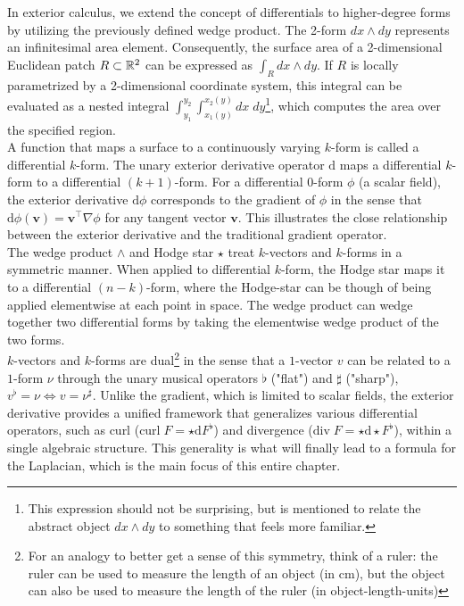 In exterior calculus, we extend the concept of differentials to higher-degree forms by utilizing the previously defined wedge product. The 2-form $dx \wedge dy$ represents an infinitesimal area element. Consequently, the surface area of a 2-dimensional Euclidean patch $R \subset \mathbb{R}^2$ can be expressed as $\int_{R} dx \wedge dy$. If $R$ is locally parametrized by a 2-dimensional coordinate system, this integral can be evaluated as a nested integral $\int_{y_1}^{y_2}\int_{x_1(y)}^{x_2(y)} dx \; dy$\footnote{This expression should not be surprising, but is mentioned to relate the abstract object $dx \wedge dy$ to something that feels more familiar.}, which computes the area over the specified region.
\\
A function that maps a surface to a continuously varying $k$-form is called a differential $k$-form. The unary exterior derivative operator $\text{d}$ maps a differential $k$-form to a differential $(k+1)$-form. For a differential $0$-form $\phi$ (a scalar field), the exterior derivative $\text{d}\phi$ corresponds to the gradient of $\phi$ in the sense that 
$\text{d}\phi(\mathbf{v}) = \mathbf{v} ^\top \nabla \phi$ for any tangent vector $\mathbf{v}$. This illustrates the close relationship between the exterior derivative and the traditional gradient operator. 
\\
The wedge product $\wedge$ and Hodge star $\star$ treat $k$-vectors and $k$-forms in a symmetric manner. When applied to differential $k$-form, the Hodge star maps it to a differential $(n-k)$-form, where the Hodge-star can be though of being applied elementwise at each point in space. The wedge product can wedge together two differential forms by taking the elementwise wedge product of the two forms.
\\
$k$-vectors and $k$-forms are dual\footnote{For an analogy to better get a sense of this symmetry, think of a ruler: the ruler can be used to measure the length of an object (in $\text{cm}$), but the object can also be used to measure the length of the ruler (in object-length-units)} in the sense that a $1$-vector $v$ can be related to a $1$-form $\nu$ through the unary musical operators $\flat$ ("flat") and $\sharp$ ("sharp"), $v^\flat = \nu \iff v = \nu^\sharp$.
Unlike the gradient, which is limited to scalar fields, the exterior derivative provides a unified framework that generalizes various differential operators, such as curl ($\text{curl}\;F =\star \text{d}F^\flat$) and divergence ($\text{div}\;F =\star \text{d}\star F^\flat$), within a single algebraic structure. This generality is what will finally lead to a formula for the Laplacian, which is the main focus of this entire chapter. 
